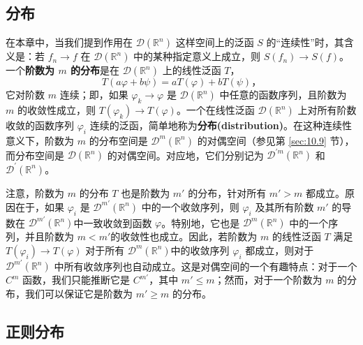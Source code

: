\subsection{分布}

在本章中，当我们提到作用在 $\mathcal{D}(\mathbb{R}^n)$
这样空间上的泛函 $S$ 的``连续性''时，其含义是：若 $f_n \to f$ 在
$\mathcal{D}(\mathbb{R}^n)$ 中的某种指定意义上成立，则
$S(f_n) \to S(f)$。一个\textbf{阶数为 $m$ 的分布}是在
$\mathcal{D}(\mathbb{R}^n)$ 上的线性泛函 $T$，
$$
T(a\varphi + b\psi) = aT(\varphi) + bT(\psi)，
$$
它对阶数 $m$ 连续；即，如果 $\varphi_k \to \varphi$ 是
$\mathcal{D}(\mathbb{R}^n)$ 中任意的函数序列，且阶数为 $m$
的收敛性成立，则 $T(\varphi_k) \to T(\varphi)$。一个在线性泛函
$\mathcal{D}(\mathbb{R}^n)$ 上对所有阶数收敛的函数序列 $\varphi_i$
连续的泛函，简单地称为\textbf{分布(distribution)}。在这种连续性意义下，阶数为
$m$ 的分布空间是 $\mathcal{D}^m(\mathbb{R}^n)$ 的对偶空间（参见第 \ref{sec:10.9} 节），而分布空间是 $\mathcal{D}(\mathbb{R}^n)$
的对偶空间。对应地，它们分别记为
$\mathcal{D}^{\prime m}(\mathbb{R}^n)$ 和
$\mathcal{D}^{\prime}(\mathbb{R}^n)$。

注意，阶数为 $m$ 的分布 $T$ 也是阶数为 $m'$ 的分布，针对所有
$m' > m$ 都成立。原因在于，如果 $\varphi_i$ 是
$\mathcal{D}^{m'}(\mathbb{R}^n)$ 中的一个收敛序列，则 $\varphi_i$
及其所有阶数 $m'$ 的导数在 $\mathcal{D}^{m'}(\mathbb{R}^n)$中一致收敛到函数 $\varphi$。特别地，它也是
$\mathcal{D}^m(\mathbb{R}^n)$ 中的一个序列，并且阶数为 $m < m'$的收敛性也成立。因此，若阶数为 $m$ 的线性泛函 $T$ 满足$T(\varphi_i) \to T(\varphi)$ 对于所有 $\mathcal{D}^m(\mathbb{R}^n)$中的收敛序列 $\varphi_i$ 都成立，则对于 $\mathcal{D}^{m'}(\mathbb{R}^n)$ 中所有收敛序列也自动成立。这是对偶空间的一个有趣特点：对于一个 $C^m$ 函数，我们只能推断它是 $C^{m'}$，其中
$m' \leq m$；然而，对于一个阶数为 $m$ 的分布，我们可以保证它是阶数为 $m' \geq m$ 的分布。

\subsection{正则分布}


